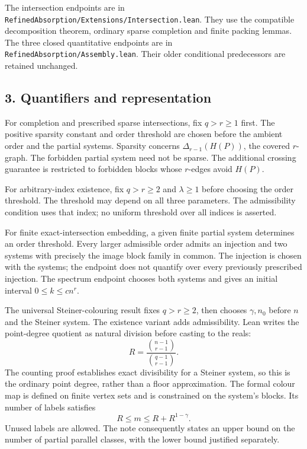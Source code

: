 \documentclass[english,11pt,a4paper]{article}
\begin{document}
The intersection endpoints are in \texttt{Refined\allowbreak{}Absorption/\allowbreak{}Extensions/\allowbreak{}Intersection.\allowbreak{}lean}. They use the compatible decomposition theorem, ordinary sparse completion and finite packing lemmas. The three closed quantitative endpoints are in \texttt{Refined\allowbreak{}Absorption/\allowbreak{}Assembly.\allowbreak{}lean}. Their older conditional predecessors are retained unchanged.

\subsection{3. Quantifiers and representation}\label{quantifiers-and-representation}

For completion and prescribed sparse intersections, fix \(q>r\ge1\) first. The positive sparsity constant and order threshold are chosen before the ambient order and the partial systems. Sparsity concerns \(\Delta_{r-1}(H(P))\), the covered \(r\)-graph. The forbidden partial system need not be sparse. The additional crossing guarantee is restricted to forbidden blocks whose \(r\)-edges avoid \(H(P)\).

For arbitrary-index existence, fix \(q>r\ge2\) and \(\lambda\ge1\) before choosing the order threshold. The threshold may depend on all three parameters. The admissibility condition uses that index; no uniform threshold over all indices is asserted.

For finite exact-intersection embedding, a given finite partial system determines an order threshold. Every larger admissible order admits an injection and two systems with precisely the image block family in common. The injection is chosen with the systems; the endpoint does not quantify over every previously prescribed injection. The spectrum endpoint chooses both systems and gives an initial interval \(0\le k\le c n^r\).

The universal Steiner-colouring result fixes \(q>r\ge2\), then chooses \(\gamma,n_0\) before \(n\) and the Steiner system. The existence variant adds admissibility. Lean writes the point-degree quotient as natural division before casting to the reals: \[R=\frac{\binom{n-1}{r-1}}{\binom{q-1}{r-1}}.\] The counting proof establishes exact divisibility for a Steiner system, so this is the ordinary point degree, rather than a floor approximation. The formal colour map is defined on finite vertex sets and is constrained on the system's blocks. Its number of labels satisfies \[R\le m\le R+R^{1-\gamma}.\] Unused labels are allowed. The note consequently states an upper bound on the number of partial parallel classes, with the lower bound justified separately.
\end{document}
